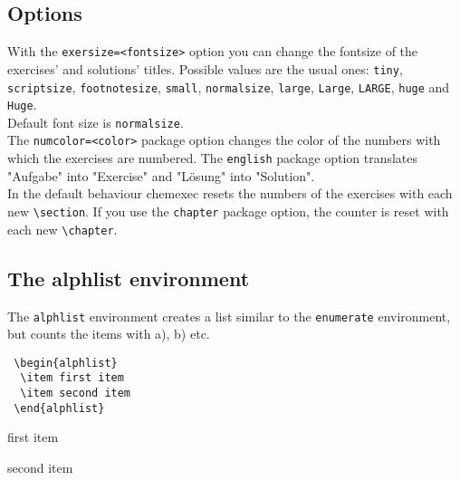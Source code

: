 \documentclass[DIV10]{scrartcl}
\newcommand{\CEx}[1][8]{%
{\color{dunkelrot}\fontfamily{pag}\fontsize{#1}{#1}\selectfont chemexec}\xspace
}
\begin{document}
\subsection{Options}
With the \verb+exersize=<fontsize>+ option you can change the fontsize of the exercises' and solutions' titles. Possible values are the usual ones: \verb=tiny=, \verb=scriptsize=, \verb=footnotesize=, \verb=small=, \verb=normalsize=, \verb=large=, \verb=Large=, \verb=LARGE=, \verb=huge= and \verb=Huge=.\\
Default font size is \verb=normalsize=.\\
The \verb+numcolor=<color>+ package option changes the color of the numbers with which the exercises are numbered. The \verb=english= package option translates "Aufgabe" into "Exercise" and "L\"osung" into "Solution".\\
In the default behaviour \CEx resets the numbers of the exercises with each new \verb=\section=. If you use the \verb=chapter= package option, the counter is reset with each new \verb=\chapter=.

\subsection{The {\ttfamily alphlist} environment}
The \texttt{alphlist} environment creates a list similar to the \verb=enumerate= environment, but counts the items with a), b) etc.
\begin{lstlisting}
 \begin{alphlist}
  \item first item
  \item second item
 \end{alphlist}
\end{lstlisting}
\begin{alphlist}
 \item first item
 \item second item
\end{alphlist}
\end{document}
